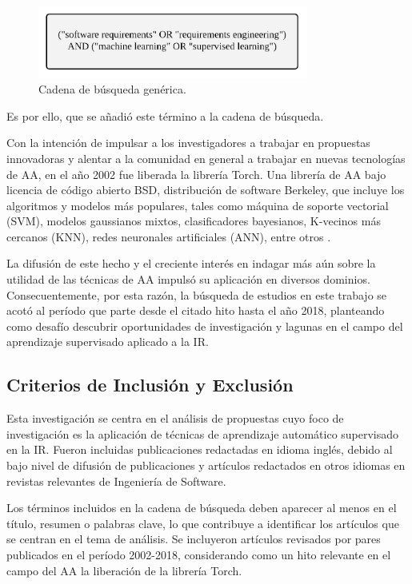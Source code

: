\documentclass[journal]{IEEEtran}
\begin{document}
\begin{figure}[!t]
\centering
\includegraphics[width=3.5in]{figures/figure3_Guada.png}
\caption{Cadena de búsqueda genérica.}
\label{fig3}
\end{figure}

Es por ello, que se añadió este término a la cadena de búsqueda.

Con la intención de impulsar a los investigadores a trabajar en propuestas innovadoras y alentar a la comunidad en general a trabajar en nuevas tecnologías de AA, en el año 2002 fue liberada la librería Torch. Una librería de AA bajo licencia de código abierto BSD, distribución de software Berkeley, que 
incluye los algoritmos y modelos más populares, tales como máquina de soporte vectorial (SVM), modelos gaussianos mixtos, clasificadores bayesianos, K-vecinos más cercanos (KNN), redes neuronales artificiales (ANN), entre otros \cite{collobert2002torch}.

La difusión de este hecho y el creciente interés en indagar más aún sobre la utilidad de las técnicas de AA impulsó su aplicación en diversos dominios. Consecuentemente, por esta razón, la búsqueda de estudios en este trabajo se acotó al período que parte desde el citado hito hasta el año 2018, planteando como desafío descubrir oportunidades de investigación y lagunas en el campo del aprendizaje supervisado aplicado a la IR.

\subsection{Criterios de Inclusión y Exclusión}

Esta investigación se centra en el análisis de propuestas cuyo foco de investigación es la aplicación de técnicas de aprendizaje automático supervisado en la IR. Fueron incluidas publicaciones redactadas en idioma inglés, debido al bajo nivel de difusión de publicaciones y artículos redactados en otros idiomas en revistas relevantes de Ingeniería de Software. 

Los términos incluidos en la cadena de búsqueda deben aparecer al menos en el título, resumen o palabras clave, lo que contribuye a identificar los artículos que se centran en el tema de análisis. Se incluyeron artículos revisados por pares publicados en el período 2002-2018, considerando como un hito relevante en el campo del AA la liberación de la librería Torch.
\end{document}
